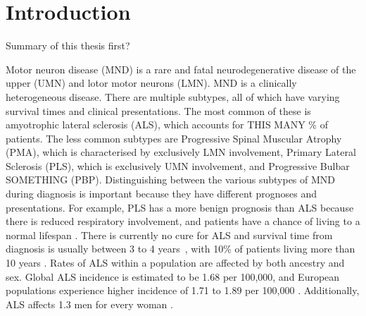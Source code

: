 \chapter{Introduction}
\label{introduction}

Summary of this thesis first?

Motor neuron disease (MND) is a rare and fatal neurodegenerative disease of the upper (UMN) and lotor motor neurons (LMN).
MND is a clinically heterogeneous disease. There are multiple subtypes, all of which have varying survival times and clinical presentations. The most common of these is amyotrophic lateral sclerosis (ALS), which accounts for THIS MANY \% of patients. The less common subtypes are Progressive Spinal Muscular Atrophy (PMA), which is characterised by exclusively LMN involvement, Primary Lateral Sclerosis (PLS), which is exclusively UMN involvement, and Progressive Bulbar SOMETHING (PBP). Distinguishing between the various subtypes of MND during diagnosis is important because they have different prognoses and presentations. For example, PLS has a more benign prognosis than ALS because there is reduced respiratory involvement, and patients have a chance of living to a normal lifespan \cite{statlandPrimaryLateralSclerosis2015}.
There is currently no cure for ALS and survival time from diagnosis is usually between 3 to 4 years~\cite{swinnenPhenotypicVariabilityAmyotrophic2014, goutmanRecentAdvancesDiagnosis2022a}, with 10\% of patients living more than 10 years \cite{pupilloLongtermSurvivalAmyotrophic2014}.
Rates of ALS within a population are affected by both ancestry and sex. Global ALS incidence is estimated to be 1.68 per 100,000, and European populations experience higher incidence of 1.71 to 1.89 per 100,000 \cite{marinVariationWorldwideIncidence2017}. Additionally, ALS affects 1.3 men for every woman \cite{fontanaTimetrendEvolutionDeterminants2021}.


